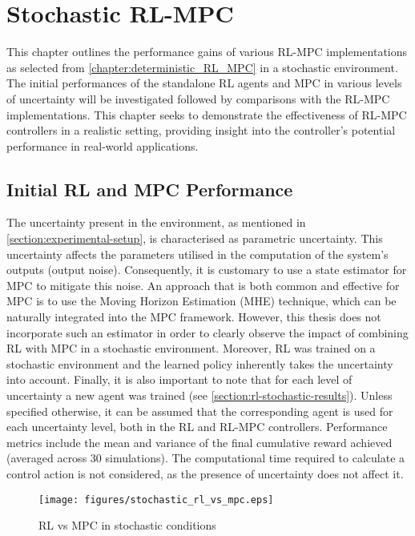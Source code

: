 \chapter{Stochastic RL-MPC}
\label{chapter:stochastic_RL_MPC}

This chapter outlines the performance gains of various RL-MPC implementations as selected from \autoref{chapter:deterministic_RL_MPC} in a stochastic environment. The initial performances of the standalone RL agents and MPC in various levels of uncertainty will be investigated followed by comparisons with the RL-MPC implementations. This chapter seeks to demonstrate the effectiveness of RL-MPC controllers in a realistic setting, providing insight into the controller's potential performance in real-world applications.

\section{Initial RL and MPC Performance}
The uncertainty present in the environment, as mentioned in \autoref{section:experimental-setup}, is characterised as parametric uncertainty. This uncertainty affects the parameters utilised in the computation of the system's outputs (output noise). Consequently, it is customary to use a state estimator for MPC to mitigate this noise. An approach that is both common and effective for MPC is to use the Moving Horizon Estimation (MHE) technique, which can be naturally integrated into the MPC framework. However, this thesis does not incorporate such an estimator in order to clearly observe the impact of combining RL with MPC in a stochastic environment. Moreover, RL was trained on a stochastic environment and the learned policy inherently takes the uncertainty into account. Finally, it is also important to note that for each level of uncertainty a new agent was trained (see \autoref{section:rl-stochastic-results}). Unless specified otherwise, it can be assumed that the corresponding agent is used for each uncertainty level, both in the RL and RL-MPC controllers. Performance metrics include the mean and variance of the final cumulative reward achieved (averaged across 30 simulations). The computational time required to calculate a control action is not considered, as the presence of uncertainty does not affect it.


\begin{figure}[H]
	\centering
	\texttt{[image: figures/stochastic\_rl\_vs\_mpc.eps]}
	\caption{RL vs MPC in stochastic conditions}
	\label{fig:stochastic-rl-vs-mpc}
\end{figure}


